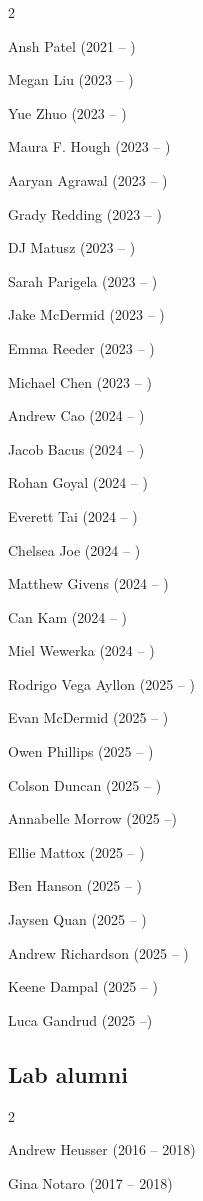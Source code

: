 \documentclass{tufte-book} %
\begin{document}
\begin{fullwidth}
\begin{multicols}{2}\raggedcolumns
\begin{list}{\quad}{}
\item Ansh Patel (2021 -- )
\item Megan Liu (2023 -- )
\item Yue Zhuo (2023 -- )
\item Maura F. Hough (2023 -- )
\item Aaryan Agrawal (2023 -- )
\item Grady Redding (2023 -- )
\item DJ Matusz (2023 -- )
\item Sarah Parigela (2023 -- )
\item Jake McDermid (2023 -- )
\item Emma Reeder (2023 -- )
\item Michael Chen (2023 -- )
\item Andrew Cao (2024 -- )
\item Jacob Bacus (2024 -- )
\item Rohan Goyal (2024 -- )
\item Everett Tai (2024 -- )
\item Chelsea Joe (2024 -- )
\item Matthew Givens (2024 -- )
\item Can Kam (2024 -- )
\item Miel Wewerka (2024 -- )
\item Rodrigo Vega Ayllon (2025 -- )
\item Evan McDermid (2025 -- )
\item Owen Phillips (2025 -- )
\item Colson Duncan (2025 -- )
\item Annabelle Morrow (2025 --)
\item Ellie Mattox (2025 -- )
\item Ben Hanson (2025 -- )
\item Jaysen Quan (2025 -- )
\item Andrew Richardson (2025 -- )
\item Keene Dampal (2025 -- )
\item Luca Gandrud (2025 --)
\end{list}
\end{multicols}

\newpage

\subsection{Lab alumni}
\begin{multicols}{2}\raggedcolumns
\begin{list}{\quad}{}
\item Andrew Heusser (2016 -- 2018)
\item Gina Notaro (2017 -- 2018)
\end{list}
\end{multicols}


\end{fullwidth}
\end{document}

